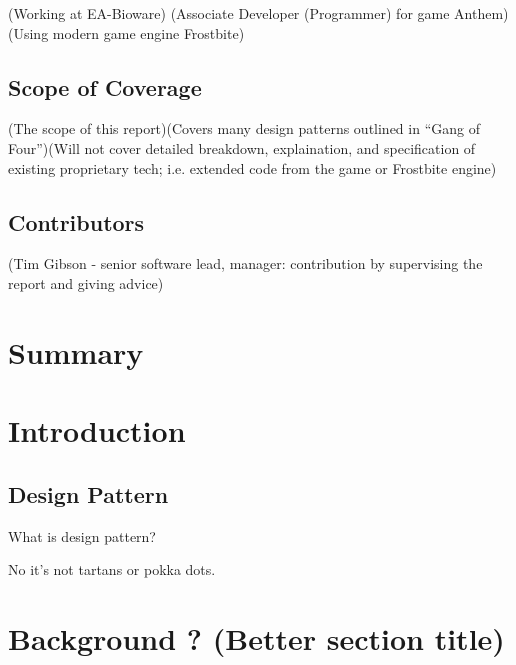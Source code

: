 \documentclass[10pt,letterpaper]{article}
\begin{document}
(Working at EA-Bioware)
(Associate Developer (Programmer) for game Anthem)
(Using modern game engine Frostbite)

\subsection*{Scope of Coverage}

(The scope of this report)(Covers many design patterns outlined in ``Gang of Four'')(Will not cover detailed breakdown, explaination, and specification of existing proprietary tech; i.e. extended code from the game or Frostbite engine)

\subsection*{Contributors}

(Tim Gibson - senior software lead, manager: contribution by supervising the report and giving advice)

\newpage

\section*{Summary}
\newpage

\listoffigures
{}
\listoftables
{}
\newpage

\setcounter{page}{1}
\setcounter{section}{-1}

\section{Introduction}

\subsection{Design Pattern}

What is design pattern?

No it's not tartans or pokka dots.

\section{Background ? (Better section title)}
\end{document}
